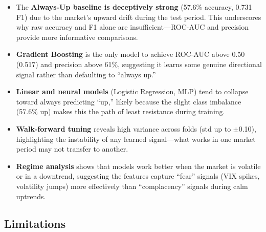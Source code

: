\documentclass[11pt]{article}
\begin{document}
\begin{itemize}
    \item The \textbf{Always-Up baseline is deceptively strong} (57.6\% accuracy, 0.731 F1) due to the market's upward drift during the test period. This underscores why raw accuracy and F1 alone are insufficient---ROC-AUC and precision provide more informative comparisons.

    \item \textbf{Gradient Boosting} is the only model to achieve ROC-AUC above 0.50 (0.517) and precision above 61\%, suggesting it learns some genuine directional signal rather than defaulting to ``always up.''

    \item \textbf{Linear and neural models} (Logistic Regression, MLP) tend to collapse toward always predicting ``up,'' likely because the slight class imbalance (57.6\% up) makes this the path of least resistance during training.

    \item \textbf{Walk-forward tuning} reveals high variance across folds (std up to $\pm$0.10), highlighting the instability of any learned signal---what works in one market period may not transfer to another.

    \item \textbf{Regime analysis} shows that models work better when the market is volatile or in a downtrend, suggesting the features capture ``fear'' signals (VIX spikes, volatility jumps) more effectively than ``complacency'' signals during calm uptrends.
\end{itemize}

\subsection{Limitations}
\end{document}
